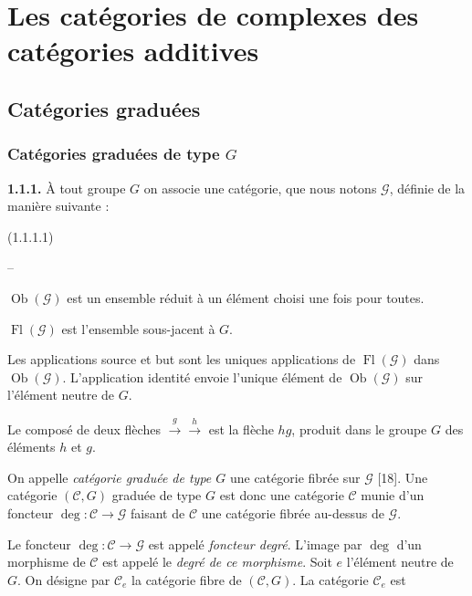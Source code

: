 \chapter{Les catégories de complexes des catégories additives}

\section{Catégories graduées}

\subsection{Catégories graduées de type \texorpdfstring{$G$}{G}}

\noindent\textbf{1.1.1.}\quad
À tout groupe $G$ on associe une catégorie, que nous notons $\mathcal G$,
définie de la manière suivante :

\noindent\textnormal{(1.1.1.1)}
\begin{list}{--}{%
  \setlength{\leftmargin}{2em}%
  \setlength{\itemsep}{0.25em}%
  \setlength{\topsep}{0.25em}%
}
  \item {}%
    $\operatorname{Ob}(\mathcal G)$ est un ensemble réduit à un élément
    choisi une fois pour toutes.
  \item {}%
    $\operatorname{Fl}(\mathcal G)$ est l'ensemble sous-jacent à $G$.
  \item {}%
    Les applications source et but sont les uniques applications de
    $\operatorname{Fl}(\mathcal G)$ dans $\operatorname{Ob}(\mathcal G)$.
    L'application identité envoie l'unique élément de
    $\operatorname{Ob}(\mathcal G)$ sur l'élément neutre de $G$.
  \item {}%
    Le composé de deux flèches
    ${}\xrightarrow{g}{}\xrightarrow{h}{}$ est la flèche $hg$, produit dans
    le groupe $G$ des éléments $h$ et $g$.
\end{list}

On appelle \emph{catégorie graduée de type $G$} une catégorie fibrée sur
$\mathcal G$ [18]. Une catégorie $(\mathcal C,G)$ graduée de type $G$ est
donc une catégorie $\mathcal C$ munie d'un foncteur
$\deg\colon\mathcal C\to\mathcal G$ faisant de $\mathcal C$ une catégorie
fibrée au-dessus de $\mathcal G$.

Le foncteur $\deg\colon\mathcal C\to\mathcal G$ est appelé
\emph{foncteur degré}. L'image par $\deg$ d'un morphisme de $\mathcal C$ est
appelé le \emph{degré de ce morphisme}.
Soit $e$ l'élément neutre de $G$.
On désigne par $\mathcal C_e$ la catégorie fibre de $(\mathcal C,G)$. La
catégorie $\mathcal C_e$ est
